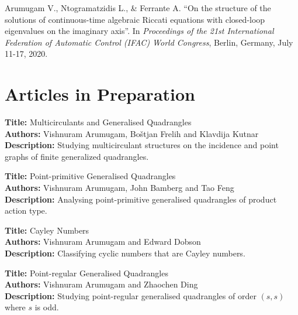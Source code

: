 \documentclass[11pt,a4paper]{article}
\newcommand{\cvname}{Vishnuram Arumugam}
\newcommand{\placeholder}[1]{{\color{muted}[#1]}}
\begin{document}
\begin{enumerate}[{[1]}]
\item Arumugam V., Ntogramatzidis L., \& Ferrante A. ``On the structure of the
solutions of continuous-time algebraic Riccati equations with closed-loop
eigenvalues on the imaginary axis''. In \emph{Proceedings of the 21st 
International Federation of Automatic Control (IFAC) World Congress}, Berlin, 
Germany, July 11-17, 2020. 

\end{enumerate}

\section{Articles in Preparation}
\begin{enumerate}[{[1]}]
\item 
\textbf{Title:} Multicirculants and Generalised Quadrangles \\
\textbf{Authors:} Vishnuram Arumugam, Bo\v{s}tjan Frelih and Klavdija Kutnar \\
\textbf{Description:} Studying multicirculant structures on the incidence and 
point graphs of finite generalized quadrangles. 

\item 
\textbf{Title:} Point-primitive Generalised Quadrangles \\ 
\textbf{Authors:} Vishnuram Arumugam, John Bamberg and Tao Feng \\
\textbf{Description:} Analysing point-primitive generalised quadrangles of 
product action type.

\item 
\textbf{Title:} Cayley Numbers \\
\textbf{Authors:} Vishnuram Arumugam and Edward Dobson \\
\textbf{Description:} Classifying cyclic numbers that are Cayley numbers. 

\item 
\textbf{Title:} Point-regular Generalised Quadrangles \\
\textbf{Authors:} Vishnuram Arumugam and Zhaochen Ding \\
\textbf{Description:} Studying point-regular generalised quadrangles of 
order $(s,s)$ where $s$ is odd. \\
\end{enumerate}
\end{document}
